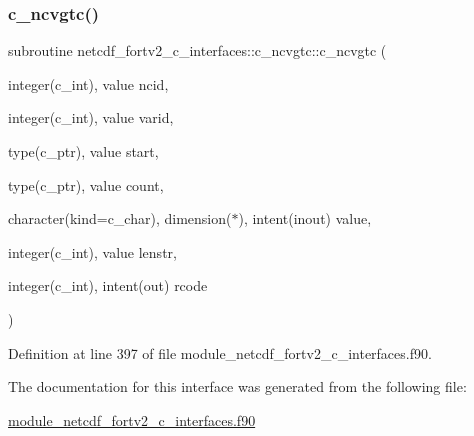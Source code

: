 \subsubsection{\texorpdfstring{c\+\_\+ncvgtc()}{c\_ncvgtc()}}
{\footnotesize\ttfamily subroutine netcdf\+\_\+fortv2\+\_\+c\+\_\+interfaces\+::c\+\_\+ncvgtc\+::c\+\_\+ncvgtc (\begin{DoxyParamCaption}\item[{integer(c\+\_\+int), value}]{ncid,  }\item[{integer(c\+\_\+int), value}]{varid,  }\item[{type(c\+\_\+ptr), value}]{start,  }\item[{type(c\+\_\+ptr), value}]{count,  }\item[{character(kind=c\+\_\+char), dimension($\ast$), intent(inout)}]{value,  }\item[{integer(c\+\_\+int), value}]{lenstr,  }\item[{integer(c\+\_\+int), intent(out)}]{rcode }\end{DoxyParamCaption})}



Definition at line 397 of file module\+\_\+netcdf\+\_\+fortv2\+\_\+c\+\_\+interfaces.\+f90.



The documentation for this interface was generated from the following file\+:\begin{DoxyCompactItemize}
\item 
\hyperlink{module__netcdf__fortv2__c__interfaces_8f90}{module\+\_\+netcdf\+\_\+fortv2\+\_\+c\+\_\+interfaces.\+f90}\end{DoxyCompactItemize}
